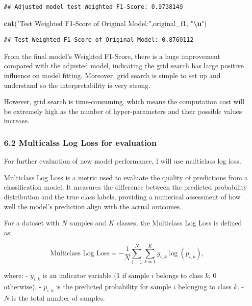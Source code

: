 \documentclass[
]{article}
\newenvironment{Shaded}{\begin{snugshade}}{\end{snugshade}}
\newcommand{\FunctionTok}[1]{\textcolor[rgb]{0.13,0.29,0.53}{\textbf{#1}}}
\newcommand{\NormalTok}[1]{#1}
\newcommand{\SpecialCharTok}[1]{\textcolor[rgb]{0.81,0.36,0.00}{\textbf{#1}}}
\newcommand{\StringTok}[1]{\textcolor[rgb]{0.31,0.60,0.02}{#1}}
\begin{document}
\begin{verbatim}
## Adjusted model test Weighted F1-Score: 0.9738149
\end{verbatim}

\begin{Shaded}
\begin{Highlighting}[]
\FunctionTok{cat}\NormalTok{(}\StringTok{"Test Weighted F1{-}Score of Original Model:"}\NormalTok{,original\_f1, }\StringTok{"}\SpecialCharTok{\textbackslash{}n}\StringTok{"}\NormalTok{)}
\end{Highlighting}
\end{Shaded}

\begin{verbatim}
## Test Weighted F1-Score of Original Model: 0.8760112
\end{verbatim}

From the final model's Weighted F1-Score, there is a huge improvement
compared with the adjusted model, indicating the grid search has large
positive influence on model fitting. Moreover, grid search is simple to
set up and understand so the interpretability is very strong.

However, grid search is time-consuming, which means the computation cost
will be extremely high as the number of hyper-parameters and their
possible values increase.

\subsubsection{6.2 Multicalss Log Loss for
evaluation}\label{multicalss-log-loss-for-evaluation}

For further evaluation of new model performance, I will use multiclass
log loss.

Multiclass Log Loss is a metric used to evaluate the quality of
predictions from a classification model. It measures the difference
between the predicted probability distribution and the true class
labels, providing a numerical assessment of how well the model's
prediction align with the actual outcomes.

For a dataset with \(N\) samples and \(K\) classes, the Multiclass Log
Loss is defined as:

\[
\text{Multiclass Log Loss} = - \frac{1}{N} \sum_{i=1}^N \sum_{k=1}^K y_{i,k} \log(p_{i,k}),
\]

where: - \(y_{i,k}\) is an indicator variable (1 if sample \(i\) belongs
to class \(k\), 0 otherwise). - \(p_{i,k}\) is the predicted probability
for sample \(i\) belonging to class \(k\). - \(N\) is the total number
of samples.
\end{document}
